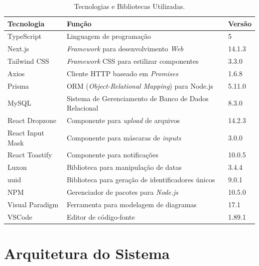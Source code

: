 \begin{table}[h]
    \centering
    \caption{Tecnologias e Bibliotecas Utilizadas.}
    \label{tab-tecnologias}
    \begin{tabularx}{\textwidth}{|p{4cm}|X|p{2cm}|}%
        \hline
        \textbf{Tecnologia} & \textbf{Função} & \textbf{Versão} \\
        \hline
        TypeScript & Linguagem de programação & 5 \\
        \hline
        Next.js & \textit{Framework} para desenvolvimento \textit{Web} & 14.1.3 \\
        \hline
        Tailwind CSS & \textit{Framework} CSS para estilizar componentes & 3.3.0 \\
        \hline
        Axios & Cliente HTTP baseado em \textit{Promises} & 1.6.8 \\
        \hline
        Prisma & ORM (\textit{Object-Relational Mapping}) para Node.js & 5.11.0 \\
        \hline
        MySQL & Sistema de Gerenciamento de Banco de Dados Relacional & 8.3.0 \\
        \hline
        React Dropzone & Componente para \textit{upload} de arquivos & 14.2.3 \\
        \hline
        React Input Mask & Componente para máscaras de \textit{inputs} & 3.0.0 \\
        \hline
        React Toastify & Componente para notificações & 10.0.5 \\
        \hline
        Luxon & Biblioteca para manipulação de datas & 3.4.4 \\
        \hline
        uuid & Biblioteca para geração de identificadores únicos & 9.0.1 \\
        \hline
        NPM & Gerenciador de pacotes para \textit{Node.js} & 10.5.0 \\
        \hline
        Visual Paradigm & Ferramenta para modelagem de diagramas & 17.1 \\
        \hline
        VSCode & Editor de código-fonte & 1.89.1 \\
        \hline
        \end{tabularx}
\end{table}


\section{Arquitetura do Sistema}
\label{sec-projeto-arquitetura}

